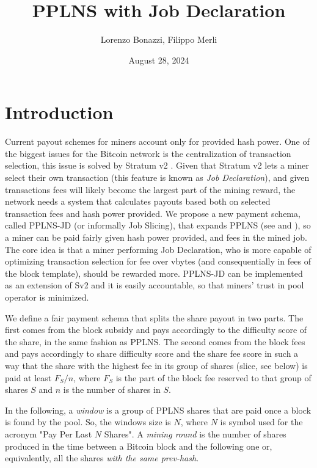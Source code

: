 \documentclass[11pt]{article}
\title{PPLNS with Job Declaration}
\author{Lorenzo Bonazzi, Filippo Merli}
\date{August 28, 2024} %
\begin{document}
\maketitle

\section{Introduction}

Current payout schemes for miners account only for provided hash power.
One of the biggest issues for the Bitcoin network is the centralization of transaction selection, this issue is solved by Stratum v2 \cite{sv2}. Given that Stratum v2 lets a miner select their own transaction (this feature is known as \emph{Job Declaration}), and given transactions fees will likely become the largest part of the mining reward, the network needs a system that calculates payouts based both on selected transaction fees and hash power provided. We propose a new payment schema, called PPLNS-JD (or informally Job Slicing), that expands PPLNS (see \cite{rosenfeld} and \cite{ocean}), so a miner can be paid fairly given hash power provided, and fees in the mined job. The core idea is that a miner performing Job Declaration, who is more capable of optimizing transaction selection for fee over vbytes (and consequentially in fees of the block template), should be rewarded more. PPLNS-JD can be implemented as an extension of Sv2 \cite{extension} and it is easily accountable, so that miners' trust in pool operator is minimized.

We define a fair payment schema that splits the share payout in two parts. The first comes from the block subsidy and pays accordingly to the difficulty score of the share, in the same fashion as PPLNS. The second comes from the block fees and pays accordingly to share difficulty score and the share fee score in such a way that the share with the highest fee in its group of shares (slice, see below) is paid at least $F_S/n$, where $F_S$ is the part of the block fee reserved to that group of shares $S$ and $n$ is the number of shares in $S$.

In the following, a \emph{window} is a group of PPLNS shares that are paid once a block is found by the pool. So, the windows size is $N$, where $N$ is symbol used for the acronym "Pay Per Last $N$ Shares". A \emph{mining round} is the number of shares produced in the time between a Bitcoin block and the following one or, equivalently, all the shares \emph{with the same prev-hash}.
\end{document}

